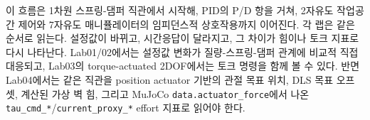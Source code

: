 이 흐름은 1차원 스프링-댐퍼 직관에서 시작해, PID의 P/D 항을 거쳐, 2자유도 작업공간 제어와 7자유도 매니퓰레이터의 임피던스적 상호작용까지 이어진다.
각 랩은 같은 순서로 읽는다.
설정값이 바뀌고, 시간응답이 달라지고, 그 차이가 힘이나 토크 지표로 다시 나타난다.
Lab01/02에서는 설정값 변화가 질량-스프링-댐퍼 관계에 비교적 직접 대응되고, Lab03의 torque-actuated 2DOF에서는 토크 명령을 함께 볼 수 있다.
반면 Lab04에서는 같은 직관을 position actuator 기반의 관절 목표 위치, DLS 목표 오프셋, 계산된 가상 벽 힘, 그리고 MuJoCo \texttt{data.actuator\_force}에서 나온 \texttt{tau\_cmd\_*}/\texttt{current\_proxy\_*} effort 지표로 읽어야 한다.

